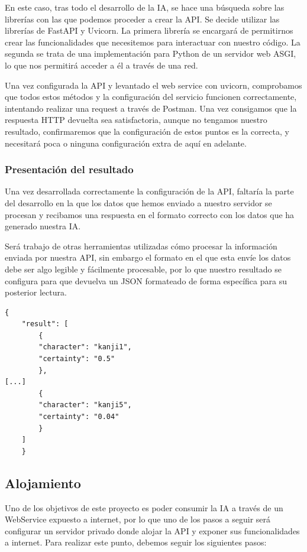 \documentclass{article}
\begin{document}
En este caso, tras todo el desarrollo de la IA, se hace una búsqueda sobre las librerías con las que podemos proceder a crear la API. Se decide utilizar las librerías de FastAPI y Uvicorn. La primera librería se encargará de permitirnos crear las funcionalidades que necesitemos para interactuar con nuestro código. La segunda se trata de una implementación para Python de un servidor web ASGI, lo que nos permitirá acceder a él a través de una red.

Una vez configurada la API y levantado el web service con uvicorn, comprobamos que todos estos métodos y la configuración del servicio funcionen correctamente, intentando realizar una request a través de Postman. Una vez consigamos que la respuesta HTTP devuelta sea satisfactoria, aunque no tengamos nuestro resultado, confirmaremos que la configuración de estos puntos es la correcta, y necesitará poca o ninguna configuración extra de aquí en adelante.

\subsubsection{Presentación del resultado}
Una vez desarrollada correctamente la configuración de la API, faltaría la parte del desarrollo en la que los datos que hemos enviado a nuestro servidor se procesan y recibamos una respuesta en el formato correcto con los datos que ha generado nuestra IA.

Será trabajo de otras herramientas utilizadas cómo procesar la información enviada por nuestra API, sin embargo el formato en el que esta envíe los datos debe ser algo legible y fácilmente procesable, por lo que nuestro resultado se configura para que devuelva un JSON formateado de forma específica para su posterior lectura.

\noindent\begin{minipage}{\textwidth}
\begin{lstlisting}[title=Formato del JSON de respuesta., numbers=none]
	{
  	"result": [
    	{
    	"character": "kanji1",
    	"certainty": "0.5"
    	},
[...]
    	{
    	"character": "kanji5",
    	"certainty": "0.04"
    	}
  	]
	}
\end{lstlisting}
\end{minipage}

\subsection{Alojamiento}
Uno de los objetivos de este proyecto es poder consumir la IA a través de un WebService expuesto a internet, por lo que uno de los pasos a seguir será configurar un servidor privado donde alojar la API y exponer sus funcionalidades a internet. Para realizar este punto, debemos seguir los siguientes pasos:
\end{document}
